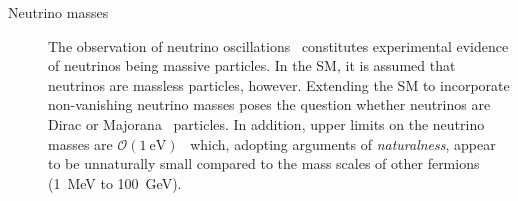 \begin{description}
\item[Neutrino masses] The observation of neutrino
  oscillations~\cite{Super-Kamiokande:1998kpq,SNO:2002tuh} constitutes
  experimental evidence of neutrinos being massive particles. In the SM, it is
  assumed that neutrinos are massless particles, however. Extending the SM to
  incorporate non-vanishing neutrino masses poses the question whether neutrinos
  are Dirac or Majorana~\cite{Majorana:1937vz} particles. In addition, upper
  limits on the neutrino masses are
  $\mathcal{O}(\SI{1}{\electronvolt})$~\cite{pdg2020} which, adopting arguments
  of \emph{naturalness}, appear to be unnaturally small compared to the mass
  scales of other fermions (\SI{1}{\MeV} to \SI{100}{\GeV}).







\end{description}
